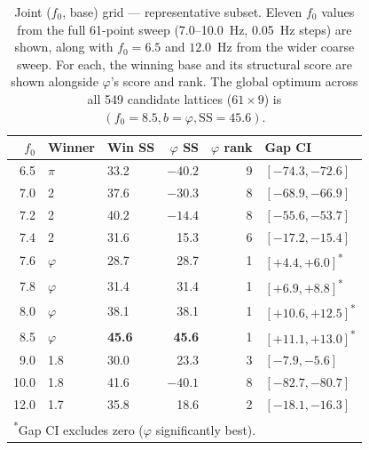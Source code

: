 \documentclass[11pt,a4paper]{article}
\newcommand{\phisym}{\varphi}
\newcommand{\fzero}{f_0}
\begin{document}
\begin{table}[H]
\centering
\caption{Joint ($\fzero$, base) grid --- representative subset. Eleven $\fzero$ values from the full 61-point sweep (7.0--10.0~Hz, 0.05~Hz steps) are shown, along with $\fzero = 6.5$ and $12.0$~Hz from the wider coarse sweep. For each, the winning base and its structural score are shown alongside $\phisym$'s score and rank. The global optimum across all 549 candidate lattices ($61 \times 9$) is $(\fzero = 8.5, b = \phisym, \text{SS} = 45.6)$.}
\label{tab:joint_grid}
\small
\begin{tabular}{rllrrl}
\toprule
$\fzero$ & Winner & Win SS & $\phisym$ SS & $\phisym$ rank & Gap CI \\
\midrule
6.5  & $\pi$  & 33.2  & $-40.2$ & 9 & $[-74.3, -72.6]$ \\
7.0  & 2      & 37.6  & $-30.3$ & 8 & $[-68.9, -66.9]$ \\
7.2  & 2      & 40.2  & $-14.4$ & 8 & $[-55.6, -53.7]$ \\
7.4  & 2      & 31.6  & 15.3    & 6 & $[-17.2, -15.4]$ \\
7.6  & $\phisym$ & 28.7 & 28.7  & 1 & $[+4.4, +6.0]$\textsuperscript{*} \\
7.8  & $\phisym$ & 31.4 & 31.4  & 1 & $[+6.9, +8.8]$\textsuperscript{*} \\
8.0  & $\phisym$ & 38.1 & 38.1  & 1 & $[+10.6, +12.5]$\textsuperscript{*} \\
8.5  & $\phisym$ & \textbf{45.6} & \textbf{45.6} & 1 & $[+11.1, +13.0]$\textsuperscript{*} \\
9.0  & 1.8    & 30.0  & 23.3    & 3 & $[-7.9, -5.6]$ \\
10.0 & 1.8    & 41.6  & $-40.1$ & 8 & $[-82.7, -80.7]$ \\
12.0 & 1.7    & 35.8  & 18.6    & 2 & $[-18.1, -16.3]$ \\
\bottomrule
\multicolumn{6}{l}{\textsuperscript{*}Gap CI excludes zero ($\phisym$ significantly best).}
\end{tabular}
\end{table}
\end{document}
